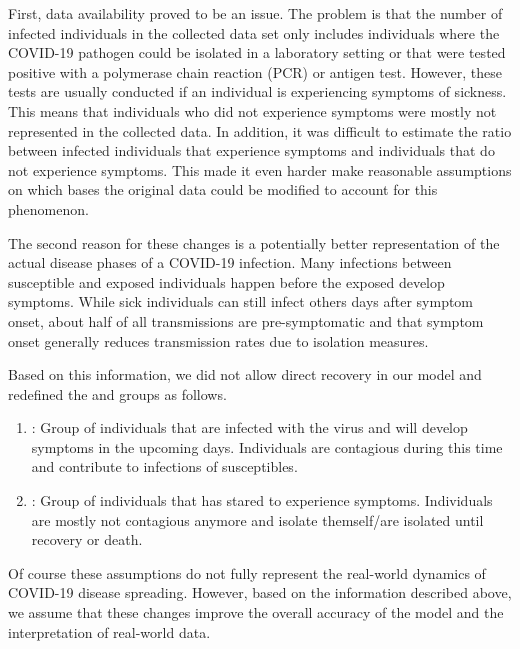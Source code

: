 First, data availability proved to be an issue. The problem is that the number of infected individuals in the
collected data set only includes individuals where the COVID-19 pathogen could be isolated in a laboratory setting or
that were tested positive with a polymerase chain reaction (PCR) or antigen test\cite{RKIcase}. However,
these tests are usually conducted if an individual is experiencing symptoms of sickness. This means that individuals who did
not experience symptoms were mostly not represented in the collected data. In addition, it was difficult to estimate
the ratio between infected individuals that experience symptoms and individuals that do not experience symptoms. This made it
even harder make reasonable assumptions on which bases the original data could be modified to account for this phenomenon.\newline

The second reason for these changes is a potentially better representation of the actual disease phases of a COVID-19 infection. Many infections
between susceptible and exposed individuals happen before the exposed develop symptoms. While sick individuals can still infect others
days after symptom onset, about half of all transmissions are pre-symptomatic \cite{casey2021presymptomatic} and that symptom onset generally
reduces transmission rates due to isolation measures\cite{RKIcov}.\newline

Based on this information, we did not allow direct recovery in our model and redefined the  and  groups as follows.
\begin{enumerate}[label=$\bullet$]
	\item {}: Group of individuals that are infected with the virus and will develop symptoms in the upcoming
		days. Individuals are contagious during this time and contribute to infections of susceptibles.
	\item {}: Group of individuals that has stared to experience symptoms. Individuals are mostly not contagious anymore
		and isolate themself/are isolated until recovery or death.
\end{enumerate}

Of course these assumptions do not fully represent the real-world dynamics of COVID-19 disease spreading. However, based on
the information described above, we assume that these changes improve the overall accuracy of the model and the interpretation of real-world data.


